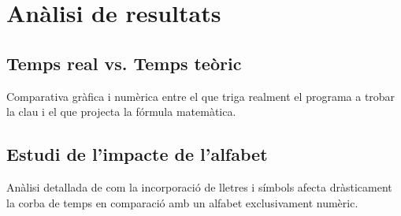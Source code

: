 \chapter{Anàlisi de resultats}

\section{Temps real vs. Temps teòric}
Comparativa gràfica i numèrica entre el que triga realment el programa a trobar la clau i el que projecta la fórmula matemàtica.

\section{Estudi de l'impacte de l'alfabet}
Anàlisi detallada de com la incorporació de lletres i símbols afecta dràsticament la corba de temps en comparació amb un alfabet exclusivament numèric.
